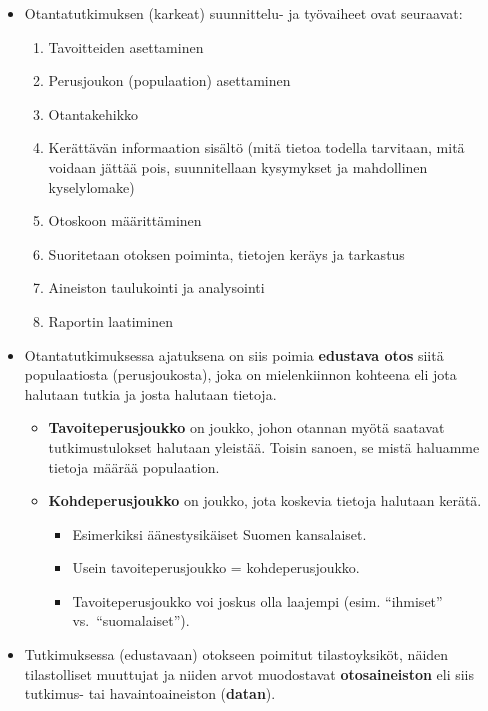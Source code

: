 \documentclass[
]{book}
\providecommand{\tightlist}{%
  \setlength{\itemsep}{0pt}\setlength{\parskip}{0pt}}
\begin{document}
\begin{itemize}
\tightlist
\item
  Otantatutkimuksen (karkeat) suunnittelu- ja työvaiheet ovat seuraavat:

  \begin{enumerate}
  \def\labelenumi{\arabic{enumi}.}
  \tightlist
  \item
    Tavoitteiden asettaminen
  \item
    Perusjoukon (populaation) asettaminen
  \item
    Otantakehikko
  \item
    Kerättävän informaation sisältö (mitä tietoa todella tarvitaan, mitä voidaan jättää pois, suunnitellaan kysymykset ja mahdollinen kyselylomake)
  \item
    Otoskoon määrittäminen
  \item
    Suoritetaan otoksen poiminta, tietojen keräys ja tarkastus
  \item
    Aineiston taulukointi ja analysointi
  \item
    Raportin laatiminen
  \end{enumerate}
\item
  Otantatutkimuksessa ajatuksena on siis poimia \textbf{edustava otos} siitä populaatiosta (perusjoukosta), joka on mielenkiinnon kohteena eli jota halutaan tutkia ja josta halutaan tietoja.

  \begin{itemize}
  \tightlist
  \item
    \textbf{Tavoiteperusjoukko} on joukko, johon otannan myötä saatavat tutkimustulokset halutaan yleistää. Toisin sanoen, se mistä haluamme tietoja määrää populaation.
  \item
    \textbf{Kohdeperusjoukko} on joukko, jota koskevia tietoja halutaan kerätä.

    \begin{itemize}
    \tightlist
    \item
      Esimerkiksi äänestysikäiset Suomen kansalaiset.
    \item
      Usein tavoiteperusjoukko = kohdeperusjoukko.
    \item
      Tavoiteperusjoukko voi joskus olla laajempi (esim. ``ihmiset'' vs.~``suomalaiset'').
    \end{itemize}
  \end{itemize}
\item
  Tutkimuksessa (edustavaan) otokseen poimitut tilastoyksiköt, näiden tilastolliset muuttujat ja niiden arvot muodostavat \textbf{otosaineiston} eli siis tutkimus- tai havaintoaineiston (\textbf{datan}).


\end{itemize}
\end{document}
